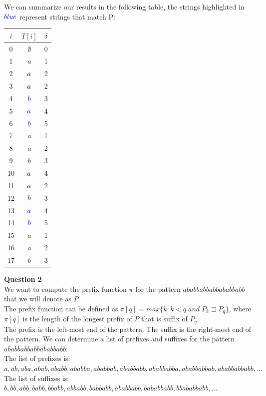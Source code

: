 \documentclass{article}
\begin{document}
We can summarize our results in the following table, the strings highlighted in $\textcolor{blue}{blue}$ represent strings that match P:
\begin{center}
\begin{tabular}{||c c c||} 
 \hline
 $i$ & $T[i]$ & $\delta$\\ [0.5ex] 
 \hline\hline
 0 & $\emptyset$ & 0 \\ 
 \hline
 1 & $a$ & 1 \\ 
 \hline
 2 & $\textcolor{blue}{a}$ & 2 \\
 \hline
 3 & $\textcolor{blue}{a}$ & 2 \\
 \hline
 4 & $\textcolor{blue}{b}$ & 3 \\
 \hline
  5 & $\textcolor{blue}{a}$ & 4 \\
 \hline
  6 & $\textcolor{blue}{b}$ & 5 \\
 \hline
  7 & $a$ & 1 \\
 \hline
  8 & $a$ & 2 \\
 \hline
  9 & $b$ & 3 \\
 \hline
  10 & $\textcolor{blue}{a}$ & 4 \\
 \hline
  11 & $\textcolor{blue}{a}$ & 2 \\
 \hline
  12 & $\textcolor{blue}{b}$ & 3 \\
 \hline
  13 & $\textcolor{blue}{a}$ & 4 \\
 \hline
  14 & $\textcolor{blue}{b}$ & 5 \\
 \hline
  15 & $a$ & 1 \\
 \hline
  16 & $a$ & 2 \\
 \hline
  17 & $b$ & 3 \\
 \hline
\end{tabular}
\end{center}


\break
{\bf Question 2}\\
We want to compute the prefix function $\pi$ for the pattern $ababbabbabbababbabb$ that we will denote as $P$.\\
The prefix function can be defined as $\pi[q] = max\{k:k<q \; and \; P_k \sqsupset P_q\}$, where $\pi[q]$ is the length of the longest prefix of $P$ that is suffix of $P_q$.\\

The prefix is the left-most end of the pattern. The suffix is the right-most end of the pattern. 
We can determine a list of prefixes and suffixes for the pattern $ababbabbabbababbabb$:\\
The list of prefixes is: $a, ab, aba, abab, ababb, ababba, ababbab, ababbabb, ababbabba, ababbabbab, ababbabbabb, ...$\\
The list of suffixes is: $b, bb, abb, babb, bbabb, abbabb, babbabb, ababbabb, bababbabb, bbababbabb, ...$\\
\end{document}
